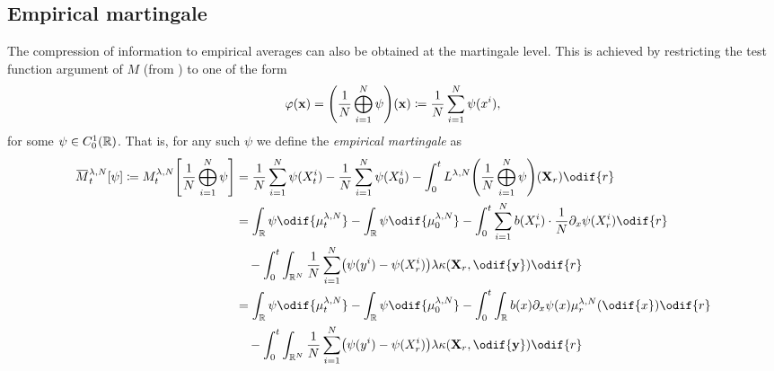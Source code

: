 \subsection{Empirical martingale}

The compression of information to empirical averages can also be obtained at the martingale level.
This is achieved by restricting the test function argument of \(M\) (from ) to one of the form
\begin{equation}
  \varphi(\bm{x}) = \br*{ \frac{1}{N} \bigoplus_{i=1}^N  \psi }(\bm{x})
  \coloneqq \frac{1}{N} \sum_{i=1}^N \psi(x^i),
\end{equation}
for some \(\psi \in C_0^1(\mathbb{R})\).
That is, for any such \( \psi \) we define the \textit{empirical martingale} as
\begin{equation}\label{eq:emp-M-derivation-start}
  \begin{split}
    \ol{M}_t^{\lambda, N}[\psi] \coloneqq
    M_t^{\lambda, N}\sbr*{\frac{1}{N} \bigoplus_{i=1}^N \psi}
     & = \frac{1}{N} \sum_{i=1}^N \psi(X_t^i) - \frac{1}{N} \sum_{i=1}^N \psi(X_0^i) - \int_0^t L^{\lambda, N} \br*{\frac{1}{N}\bigoplus_{i=1}^N \psi} (\bm{X}_r) \odif{r} \\
     & = \int_\potspace \psi \odif{\mu_t^{\lambda, N}} - \int_\potspace \psi \odif{\mu_0^{\lambda, N}}
    - \int_0^t \sum_{i=1}^N b(X_{r}^i) \cdot \frac{1}{N} \partial_{x} \psi(X_{r}^i) \odif{r}                                                                               \\
     & \quad - \int_0^t \int_{\potspace^N} \frac{1}{N} \sum_{i=1}^N \br*{ \psi(y^i) - \psi(X_{r}^i) } \lambda \kappa(\bm{X}_r, \odif{\bm{y}}) \odif{r}                     \\
     & = \int_\potspace \psi \odif{\mu_t^{\lambda, N}} - \int_\potspace \psi \odif{\mu_0^{\lambda, N}}
    - \int_0^t \int_\potspace b(x) \partial_{x} \psi(x) \mu_r^{\lambda, N}(\odif{x}) \odif{r}                                                                              \\
     & \quad - \int_0^t \int_{\potspace^N} \frac{1}{N} \sum_{i=1}^N \br*{ \psi(y^i) - \psi(X_{r}^i) } \lambda \kappa(\bm{X}_r, \odif{\bm{y}}) \odif{r}                     \\
  \end{split}
\end{equation}
